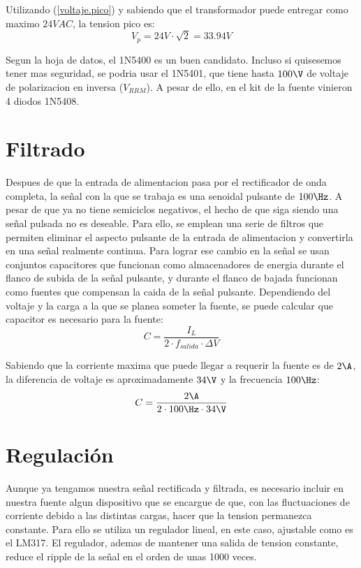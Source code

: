 \documentclass[chaptersright]{informeutn}
\begin{document}
          Utilizando (\ref{voltaje.pico}) y sabiendo que el transformador puede entregar como maximo $24VAC$, la
          tension pico es:
          \begin{equation*}
            V_p = 24V \cdot \sqrt{2} = 33.94V
          \end{equation*}

          Segun la hoja de datos, el 1N5400 es un buen candidato. Incluso si quisesemos tener mas seguridad, se podria
          usar el 1N5401, que tiene hasta $100\V$ de voltaje de polarizacion en inversa ($V_{RRM}$). A pesar de ello,
          en el kit de la fuente vinieron 4 diodos 1N5408.


      \section{Filtrado}
        Despues de que la entrada de alimentacion pasa por el rectificador de onda completa, la señal con la que se
        trabaja es una senoidal pulsante de $100\Hz$. A pesar de que ya no tiene semiciclos negativos, el hecho de que
        siga siendo una señal pulsada no es deseable. Para ello, se emplean una serie de filtros que permiten eliminar
        el aspecto pulsante de la entrada de alimentacion y convertirla en una señal realmente continua. Para lograr
        ese cambio en la señal se usan conjuntos capacitores que funcionan como almacenadores de energia durante el
        flanco de subida de la señal pulsante, y durante el flanco de bajada funcionan como fuentes que compensan
        la caida de la señal pulsante. Dependiendo del voltaje y la carga a la que se planea someter la fuente, se
        puede calcular que capacitor es necesario para la fuente:
        \begin{equation}
            C = \frac{I_{L}}{2 \cdot f_{salida} \cdot \varDelta V}
        \end{equation}

        Sabiendo que la corriente maxima que puede llegar a requerir la fuente es de $2\A$, la diferencia de voltaje
        es aproximadamente $34\V$ y la frecuencia $100\Hz$:
        \begin{equation*}
          C = \frac{2\A}{2 \cdot 100\Hz \cdot 34\V}
        \end{equation*}

      \section{Regulación}
        Aunque ya tengamos nuestra señal rectificada y filtrada, es necesario incluir en nuestra fuente algun
        dispositivo que se encargue de que, con las fluctuaciones de corriente debido a las distintas cargas, hacer que
        la tension permanezca constante. Para ello se utiliza un regulador lineal, en este caso, ajustable como es el
        LM317. El regulador, ademas de mantener una salida de tension constante, reduce el ripple de la señal en el
        orden de unas 1000 veces.
\end{document}
